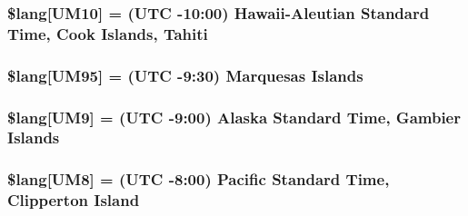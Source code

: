 \subsubsection[{\$lang}]{\setlength{\rightskip}{0pt plus 5cm}\$lang\mbox{[}\textquotesingle{}U\+M10\textquotesingle{}\mbox{]} = \textquotesingle{}(U\+T\+C -\/10\+:00) Hawaii-\/Aleutian Standard Time, Cook Islands, Tahiti\textquotesingle{}}\label{_admin_2system_2language_2english_2date__lang_8php_a671d507e120e16f7e7718be0ed0aea74}
\hypertarget{_admin_2system_2language_2english_2date__lang_8php_a7cd7a4418ccf42c7daae2a098ba8f9e6}{}
\subsubsection[{\$lang}]{\setlength{\rightskip}{0pt plus 5cm}\$lang\mbox{[}\textquotesingle{}U\+M95\textquotesingle{}\mbox{]} = \textquotesingle{}(U\+T\+C -\/9\+:30) Marquesas Islands\textquotesingle{}}\label{_admin_2system_2language_2english_2date__lang_8php_a7cd7a4418ccf42c7daae2a098ba8f9e6}
\hypertarget{_admin_2system_2language_2english_2date__lang_8php_a5509302f8ddd971cb58e1f49f012bbac}{}
\subsubsection[{\$lang}]{\setlength{\rightskip}{0pt plus 5cm}\$lang\mbox{[}\textquotesingle{}U\+M9\textquotesingle{}\mbox{]} = \textquotesingle{}(U\+T\+C -\/9\+:00) Alaska Standard Time, Gambier Islands\textquotesingle{}}\label{_admin_2system_2language_2english_2date__lang_8php_a5509302f8ddd971cb58e1f49f012bbac}
\hypertarget{_admin_2system_2language_2english_2date__lang_8php_ab3ed4c273fcb61197ef7d8e4bae07415}{}
\subsubsection[{\$lang}]{\setlength{\rightskip}{0pt plus 5cm}\$lang\mbox{[}\textquotesingle{}U\+M8\textquotesingle{}\mbox{]} = \textquotesingle{}(U\+T\+C -\/8\+:00) Pacific Standard Time, Clipperton Island\textquotesingle{}}\label{_admin_2system_2language_2english_2date__lang_8php_ab3ed4c273fcb61197ef7d8e4bae07415}
\hypertarget{_admin_2system_2language_2english_2date__lang_8php_aa642f12cf461f915682b17c0c30b2475}{}
